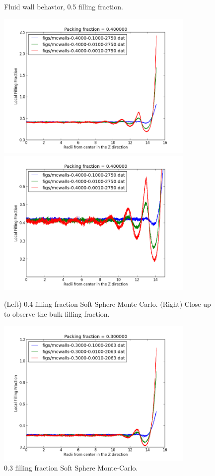 \documentclass[a4paper,12pt]{article}
\begin{document}
\begin{landscape}
\begin{figure}[h]
    \caption{Fluid wall behavior, 0.5 filling fraction.}
  \end{figure}
  \newpage
  \begin{figure}
    \centering
    \includegraphics[width=3.75in]{full_40.png}
    \includegraphics[width=3.75in]{bulk_40.png}
    \caption{(Left) 0.4 filling fraction Soft Sphere Monte-Carlo.  (Right) Close up to observe the bulk filling fraction.}
    \includegraphics[width=3.75in]{full_30.png}
    \caption{0.3 filling fraction Soft Sphere Monte-Carlo.}
  \end{figure}

\end{landscape}
\end{document}
